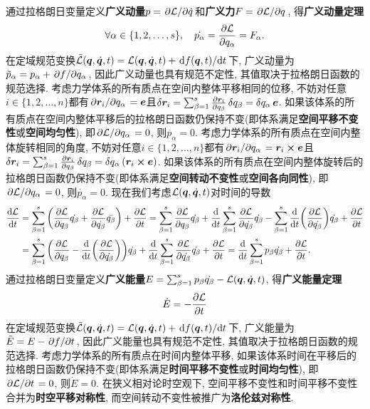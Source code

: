 通过拉格朗日变量定义\textbf{广义动量}$ p=\pdv*{\mathcal{L}}{\dot{q}} $和\textbf{广义力}$ F=\pdv*{\mathcal{L}}{q} $, 得\textbf{广义动量定理}
\begin{equation}
    \forall \alpha \in \{1,2,\ldots,s\}, \quad\dot{p_{\alpha}}=\pdv{\mathcal{L}}{q_{\alpha}}=F_{\alpha}.
\end{equation}
在定域规范变换$ \tilde{\mathcal{L}}(\vb*{q},\dot{\vb*{q}},t)=\mathcal{L}(\vb*{q},\dot{\vb*{q}},t)+\dv*{f(\vb*{q},t)}{t} $下, 广义动量为$ \tilde{p}_{\alpha}=p_{\alpha}+\pdv*{f}{q_{\alpha}} $, 因此广义动量也具有规范不定性, 其值取决于拉格朗日函数的规范选择. 考虑力学体系的所有质点在空间内整体平移相同的位移, 不妨对任意$ i \in \{1,2,\ldots,n\} $都有$ \pdv*{\vb*{r}_i}{q_{\alpha}}=\vb*{e} $且$ \var{\vb*{r}_i} = \sum_{\beta=1}^s \pdv{\vb*{r}_i}{q_{\beta}} \var{q_{\beta}} = \var{q_{\alpha}} \vb*{e} $. 如果该体系的所有质点在空间内整体平移后的拉格朗日函数仍保持不变(即体系满足\textbf{空间平移不变性}或\textbf{空间均匀性}), 即$ \pdv*{\mathcal{L}}{q_{\alpha}}=0 $, 则$ \dot{p_{\alpha}}=0 $. 考虑力学体系的所有质点在空间内整体旋转相同的角度, 不妨对任意$ i \in \{1,2,\ldots,n\} $都有$ \pdv*{\vb*{r}_i}{q_{\alpha}}=\vb*{r}_i \cross \vb*{e} $且$ \var{\vb*{r}_i} = \sum_{\beta=1}^s \pdv{\vb*{r}_i}{q_{\beta}} \var{q_{\beta}} = \var{q_{\alpha}} (\vb*{r}_i \cross \vb*{e}) $. 如果该体系的所有质点在空间内整体旋转后的拉格朗日函数仍保持不变(即体系满足\textbf{空间转动不变性}或\textbf{空间各向同性}), 即$ \pdv*{\mathcal{L}}{q_{\alpha}}=0 $, 则$ \dot{p_{\alpha}}=0 $. 现在我们考虑$ \mathcal{L}(\vb*{q},\dot{\vb*{q}},t) $对时间的导数
\begin{align*}
    \dv{\mathcal{L}}{t} &= \sum_{\beta=1}^s \bigg(\pdv{\mathcal{L}}{q_{\beta}}\dot{q_{\beta}} + \pdv{\mathcal{L}}{\dot{q_{\beta}}} \ddot{q_{\beta}} \bigg) + \pdv{\mathcal{L}}{t} = \sum_{\beta=1}^s \pdv{\mathcal{L}}{q_{\beta}}\dot{q_{\beta}} + \dv{t} \sum_{\beta=1}^s \pdv{\mathcal{L}}{\dot{q_{\beta}}} \dot{q_{\beta}} - \sum_{\beta=1}^s \dv{t}(\pdv{\mathcal{L}}{\dot{q_{\beta}}}) \dot{q_{\beta}} + \pdv{\mathcal{L}}{t} \\
    &=\sum_{\beta=1}^s \bigg(\pdv{\mathcal{L}}{q_{\beta}} - \dv{t}(\pdv{\mathcal{L}}{\dot{q_{\beta}}}) \bigg)\dot{q_{\beta}} + \dv{t} \sum_{\beta=1}^s \pdv{\mathcal{L}}{\dot{q_{\beta}}} \dot{q_{\beta}} + \pdv{\mathcal{L}}{t} = \dv{t} \sum_{\beta=1}^s p_{\beta} \dot{q_{\beta}} + \pdv{\mathcal{L}}{t}.
\end{align*}
通过拉格朗日变量定义\textbf{广义能量}$ E=\sum_{\beta=1}^s p_{\beta}\dot{q_{\beta}} - \mathcal{L}(\vb*{q},\dot{\vb*{q}},t) $, 得\textbf{广义能量定理}
\begin{equation}
    \dot{E}=-\pdv{\mathcal{L}}{t}
\end{equation}
在定域规范变换$ \tilde{\mathcal{L}}(\vb*{q},\dot{\vb*{q}},t)=\mathcal{L}(\vb*{q},\dot{\vb*{q}},t)+\dv*{f(\vb*{q},t)}{t} $下, 广义能量为$ \tilde{E}=E-\pdv*{f}{t} $, 因此广义能量也具有规范不定性, 其值取决于拉格朗日函数的规范选择. 考虑力学体系的所有质点在时间内整体平移, 如果该体系时间在平移后的拉格朗日函数仍保持不变(即体系满足\textbf{时间平移不变性}或\textbf{时间均匀性}), 即$ \pdv*{\mathcal{L}}{t}=0 $, 则$ \dot{E}=0 $. 在狭义相对论时空观下, 空间平移不变性和时间平移不变性合并为\textbf{时空平移对称性}, 而空间转动不变性被推广为\textbf{洛伦兹对称性}.

